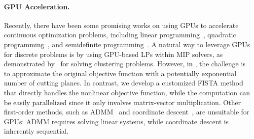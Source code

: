 \paragraph{GPU Acceleration.}
Recently, there have been some promising works on using GPUs to accelerate continuous optimization problems, including linear programming~\citep{applegate2021practical, lu2023cupdlp}, quadratic programming~\citep{lu2023practical}, and semidefinite programming~\citep{han2024accelerating}.
A natural way to leverage GPUs for discrete problems is by using GPU-based LPs within MIP solvers, as demonstrated by~\citet{de2024power} for solving clustering problems.
However, in \citep{de2024power}, the challenge is to approximate the original objective function with a potentially exponential number of cutting planes. %
In contrast, we develop a customized FISTA method that directly handles the nonlinear objective function, while the computation can be easily parallelized since it only involves matrix-vector multiplication. 
Other first-order methods, such as ADMM~\citep{liu2024okridge} and coordinate descent~\citep{hazimeh2022sparse}, are unsuitable for GPUs: ADMM requires solving linear systems, while coordinate descent is inherently sequential.

